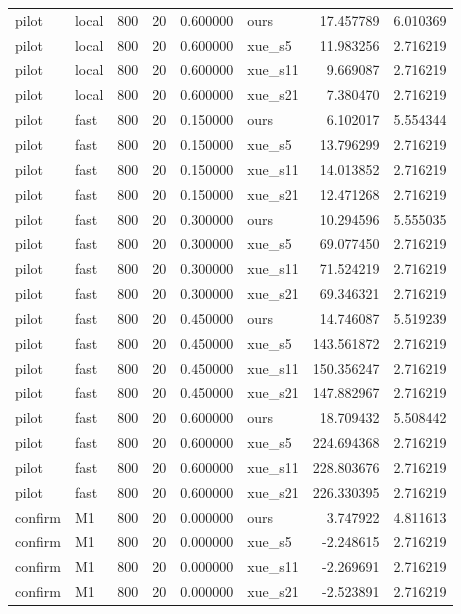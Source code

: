 \begin{longtable}{llrrrlrr}
pilot & local & 800 & 20 & 0.600000 & ours & 17.457789 & 6.010369 \\
pilot & local & 800 & 20 & 0.600000 & xue\_s5 & 11.983256 & 2.716219 \\
pilot & local & 800 & 20 & 0.600000 & xue\_s11 & 9.669087 & 2.716219 \\
pilot & local & 800 & 20 & 0.600000 & xue\_s21 & 7.380470 & 2.716219 \\
pilot & fast & 800 & 20 & 0.150000 & ours & 6.102017 & 5.554344 \\
pilot & fast & 800 & 20 & 0.150000 & xue\_s5 & 13.796299 & 2.716219 \\
pilot & fast & 800 & 20 & 0.150000 & xue\_s11 & 14.013852 & 2.716219 \\
pilot & fast & 800 & 20 & 0.150000 & xue\_s21 & 12.471268 & 2.716219 \\
pilot & fast & 800 & 20 & 0.300000 & ours & 10.294596 & 5.555035 \\
pilot & fast & 800 & 20 & 0.300000 & xue\_s5 & 69.077450 & 2.716219 \\
pilot & fast & 800 & 20 & 0.300000 & xue\_s11 & 71.524219 & 2.716219 \\
pilot & fast & 800 & 20 & 0.300000 & xue\_s21 & 69.346321 & 2.716219 \\
pilot & fast & 800 & 20 & 0.450000 & ours & 14.746087 & 5.519239 \\
pilot & fast & 800 & 20 & 0.450000 & xue\_s5 & 143.561872 & 2.716219 \\
pilot & fast & 800 & 20 & 0.450000 & xue\_s11 & 150.356247 & 2.716219 \\
pilot & fast & 800 & 20 & 0.450000 & xue\_s21 & 147.882967 & 2.716219 \\
pilot & fast & 800 & 20 & 0.600000 & ours & 18.709432 & 5.508442 \\
pilot & fast & 800 & 20 & 0.600000 & xue\_s5 & 224.694368 & 2.716219 \\
pilot & fast & 800 & 20 & 0.600000 & xue\_s11 & 228.803676 & 2.716219 \\
pilot & fast & 800 & 20 & 0.600000 & xue\_s21 & 226.330395 & 2.716219 \\
confirm & M1 & 800 & 20 & 0.000000 & ours & 3.747922 & 4.811613 \\
confirm & M1 & 800 & 20 & 0.000000 & xue\_s5 & -2.248615 & 2.716219 \\
confirm & M1 & 800 & 20 & 0.000000 & xue\_s11 & -2.269691 & 2.716219 \\
confirm & M1 & 800 & 20 & 0.000000 & xue\_s21 & -2.523891 & 2.716219 \\

\end{longtable}
